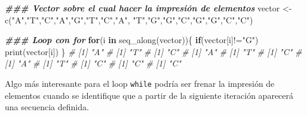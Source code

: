 \documentclass[
]{article}
\newenvironment{Shaded}{\begin{snugshade}}{\end{snugshade}}
\newcommand{\CommentTok}[1]{\textcolor[rgb]{0.56,0.35,0.01}{\textit{#1}}}
\newcommand{\ControlFlowTok}[1]{\textcolor[rgb]{0.13,0.29,0.53}{\textbf{#1}}}
\newcommand{\DocumentationTok}[1]{\textcolor[rgb]{0.56,0.35,0.01}{\textbf{\textit{#1}}}}
\newcommand{\FunctionTok}[1]{\textcolor[rgb]{0.00,0.00,0.00}{#1}}
\newcommand{\NormalTok}[1]{#1}
\newcommand{\OtherTok}[1]{\textcolor[rgb]{0.56,0.35,0.01}{#1}}
\newcommand{\SpecialCharTok}[1]{\textcolor[rgb]{0.00,0.00,0.00}{#1}}
\newcommand{\StringTok}[1]{\textcolor[rgb]{0.31,0.60,0.02}{#1}}
\theoremstyle{definition}
\theoremstyle{definition}
\theoremstyle{definition}
\theoremstyle{definition}
\theoremstyle{remark}
\begin{document}
\begin{Shaded}
\begin{Highlighting}[]
\DocumentationTok{\#\#\# Vector sobre el cual hacer la impresión de elementos}
\NormalTok{vector }\OtherTok{\textless{}{-}} \FunctionTok{c}\NormalTok{(}\StringTok{"A"}\NormalTok{,}\StringTok{"T"}\NormalTok{,}\StringTok{"C"}\NormalTok{,}\StringTok{"A"}\NormalTok{,}\StringTok{"G"}\NormalTok{,}\StringTok{"T"}\NormalTok{,}\StringTok{"C"}\NormalTok{,}\StringTok{"A"}\NormalTok{,}
            \StringTok{"T"}\NormalTok{,}\StringTok{"G"}\NormalTok{,}\StringTok{"G"}\NormalTok{,}\StringTok{"C"}\NormalTok{,}\StringTok{"G"}\NormalTok{,}\StringTok{"G"}\NormalTok{,}\StringTok{"C"}\NormalTok{,}\StringTok{"C"}\NormalTok{)}

\DocumentationTok{\#\#\# Loop con for}
\ControlFlowTok{for}\NormalTok{(i }\ControlFlowTok{in} \FunctionTok{seq\_along}\NormalTok{(vector))\{}
  \ControlFlowTok{if}\NormalTok{(vector[i]}\SpecialCharTok{!=}\StringTok{"G"}\NormalTok{)}
  \FunctionTok{print}\NormalTok{(vector[i])}
\NormalTok{\}}
\CommentTok{\# [1] "A"}
\CommentTok{\# [1] "T"}
\CommentTok{\# [1] "C"}
\CommentTok{\# [1] "A"}
\CommentTok{\# [1] "T"}
\CommentTok{\# [1] "C"}
\CommentTok{\# [1] "A"}
\CommentTok{\# [1] "T"}
\CommentTok{\# [1] "C"}
\CommentTok{\# [1] "C"}
\CommentTok{\# [1] "C"}
\end{Highlighting}
\end{Shaded}

Algo más interesante para el loop \texttt{while} podría ser frenar la impresión de elementos cuando se identifique que a partir de la siguiente iteración aparecerá una secuencia definida.
\end{document}
